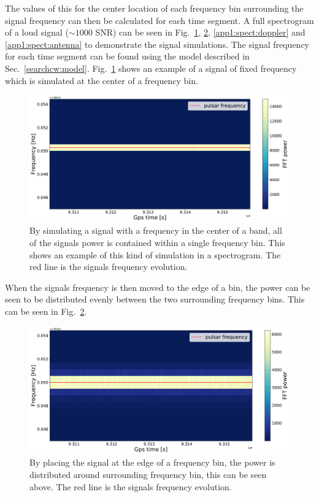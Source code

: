 The values of this for the center location of each frequency bin surrounding the signal frequency can then be calculated for each time segment. 
A full spectrogram of a loud signal ($\sim 1000$ \gls{SNR}) can be seen in Fig.~\ref{app1:spect:centerbin}, \ref{app1:spect:edgebin}, \ref{app1:spect:doppler} and \ref{app1:spect:antenna} to demonstrate the signal simulations.
The signal frequency for each time segment can be found using the model described in Sec.~\ref{searchcw:model}.
Fig.~\ref{app1:spect:centerbin} shows an example of a signal of fixed frequency which is simulated at the center of a frequency bin.
\begin{figure}[h]
	\centering
	\includegraphics[width=\linewidth]{AppendixA/centerbin_nodop_noant.pdf}
	\caption[Generated spectrogram in center of frequency bin.]{By simulating a signal with a frequency in the center of a band, all of the signals power is contained within a single frequency bin. This shows an example of this kind of simulation in a spectrogram. The red line is the signals frequency evolution.}
	\label{app1:spect:centerbin}
\end{figure}
When the signals frequency is then moved to the edge of a bin, the power can be seen to be distributed evenly between the two surrounding frequency bins. This can be seen in Fig.~\ref{app1:spect:edgebin}.
\begin{figure}[h]
	\centering
	\includegraphics[width=\linewidth]{AppendixA/edgebin_nodop_noant.pdf}
	\caption[Generated spectrogram at edge of frequency bin.]{By placing the signal at the edge of a frequency bin, the power is distributed around surrounding frequency bin, this can be seen above. The red line is the signals frequency evolution.}
	\label{app1:spect:edgebin}
\end{figure}
